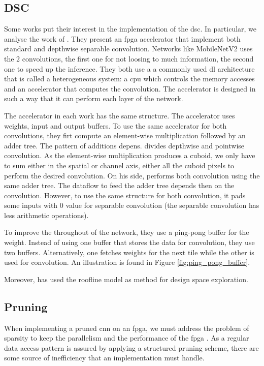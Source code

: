 \subsection{DSC}
%
%
Some works put their interest in the implementation of the \acrshort{dsc}. In particular, we analyse the work of \textcite{bai_cnn_2018, liu_fpga-based_2019}. They present an \acrshort{fpga} accelerator that implement both standard and depthwise separable convolution. Networks like MobileNetV2 uses the 2 convolutions, the first one for not loosing to much information, the second one to speed up the inference. They both use a a commonly used \acrshort{dl} architecture that is called a heterogeneous system: a \acrshort{cpu} which controls the memory accesses and an accelerator that computes the convolution. The accelerator is designed in such a way that it can perform each layer of the network.

The accelerator in each work has the same structure. The accelerator uses weights, input and output buffers. To use the same accelerator for both convolutions, they firt compute an element-wise multiplication followed by an adder tree. The pattern of additions depens. \textcite{bai_cnn_2018} divides depthwise and pointwise convolution. As the element-wise multiplication produces a cuboid, we only have to sum either in the spatial or channel axis, either all the cuboid pixels to perform the desired convolution. On his side, \textcite{liu_fpga-based_2019} performs both convolution using the same adder tree. The dataflow to feed the adder tree depends then on the convolution. However, to use the same structure for both convolution, it pads some inputs with 0 value for separable convolution (the separable convolution has less arithmetic operations).

To improve the throughout of the network, they use a ping-pong buffer for the weight. Instead of using one buffer that stores the data for convolution, they use two buffers. Alternatively, one fetches weights for the next tile while the other is used for convolution. An illustration is found in Figure \ref{fig:ping_pong_buffer}.

Moreover, \textcite{liu_fpga-based_2019} has used the roofline model as method for design space exploration.
%
%
\subsection{Pruning} \label{subsec:impl_prun}
%
%
When implementing a pruned \acrshort{cnn} on an \acrshort{fpga}, we must address the problem of sparsity to keep the parallelism and the performance of the \acrshort{fpga} \cite{zhu_efficient_2020}. As a regular data access pattern is assured by applying a structured pruning scheme, there are some source of inefficiency that an implementation must handle.

